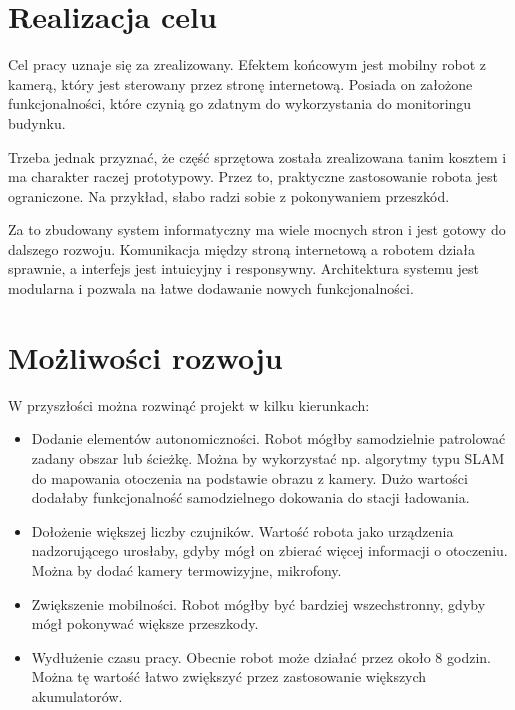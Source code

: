\section{Realizacja celu}
Cel pracy uznaje się za zrealizowany.
Efektem końcowym jest mobilny robot z kamerą, który jest sterowany przez stronę internetową.
Posiada on założone funkcjonalności, które czynią go zdatnym do wykorzystania do monitoringu budynku.

Trzeba jednak przyznać, że część sprzętowa została zrealizowana tanim kosztem i ma charakter raczej prototypowy.
Przez to, praktyczne zastosowanie robota jest ograniczone.
Na przykład, słabo radzi sobie z pokonywaniem przeszkód.

Za to zbudowany system informatyczny ma wiele mocnych stron i jest gotowy do dalszego rozwoju.
Komunikacja między stroną internetową a robotem działa sprawnie, a interfejs jest intuicyjny i responsywny.
Architektura systemu jest modularna i pozwala na łatwe dodawanie nowych funkcjonalności.

\section{Możliwości rozwoju}
W przyszłości można rozwinąć projekt w kilku kierunkach:
\begin{itemize}
    \item Dodanie elementów autonomiczności.
    Robot mógłby samodzielnie patrolować zadany obszar lub ścieżkę.
    Można by wykorzystać np. algorytmy typu SLAM do mapowania otoczenia na podstawie obrazu z kamery.
    Dużo wartości dodałaby funkcjonalność samodzielnego dokowania do stacji ładowania.
    \item Dołożenie większej liczby czujników.
    Wartość robota jako urządzenia nadzorującego urosłaby, gdyby mógł on zbierać więcej informacji o otoczeniu.
    Można by dodać kamery termowizyjne, mikrofony.
    \item Zwiększenie mobilności.
    Robot mógłby być bardziej wszechstronny, gdyby mógł pokonywać większe przeszkody.
    \item Wydłużenie czasu pracy.
    Obecnie robot może działać przez około 8 godzin.
    Można tę wartość łatwo zwiększyć przez zastosowanie większych akumulatorów.
\end{itemize}